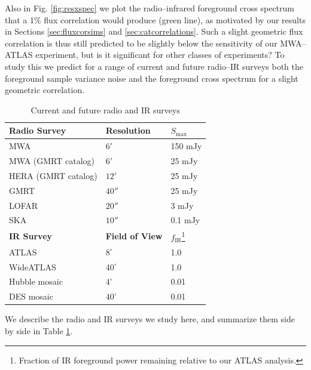 \documentclass[numberedappendix]{emulateapj}
\newcommand{\ir}{\text{IR}}
\begin{document}
Also in Fig. \ref{fig:resxspec} we plot the radio--infrared foreground cross spectrum that a 1\% flux correlation would produce (green line), as motivated by our results in Sections \ref{sec:fluxcorsims} and \ref{sec:catcorrelations}. Such a slight geometric flux correlation is thus still predicted to be slightly below the sensitivity of our MWA--ATLAS experiment, but is it significant for other classes of experiments? To study this we predict for a range of current and future radio--IR surveys both the foreground sample variance noise and the foreground cross spectrum for a slight geometric correlation. 

\begin{table}
\caption{Current and future radio and IR surveys\label{tab:expts}}
\begin{tabular}{|l | l | l|}
\hline
\textbf{Radio Survey} & \textbf{Resolution} & \textbf{$S_\text{max}$} \\
\hline
MWA & $6'$ & 150 mJy \\
MWA (GMRT catalog) & $6'$ & 25 mJy \\
HERA (GMRT catalog) & $12'$ & 25 mJy \\
GMRT & $40''$ & 25 mJy \\
LOFAR & $20''$ & 3 mJy \\
SKA & $10''$ & 0.1 mJy \\
\hline\hline
\textbf{IR Survey} & \textbf{Field of View} & \textbf{$f_\ir$}\footnote{Fraction of IR foreground power remaining relative to our ATLAS analysis.} \\
\hline
ATLAS & $8^\circ$ & 1.0 \\
WideATLAS & $40^\circ$ & 1.0 \\
Hubble mosaic & $4^\circ$ & 0.01 \\
DES mosaic & $40^\circ$ & 0.01 \\
\hline
\end{tabular}
\end{table}


We describe the radio and IR surveys we study here, and summarize them side by side in Table \ref{tab:expts}. \\
\end{document}
